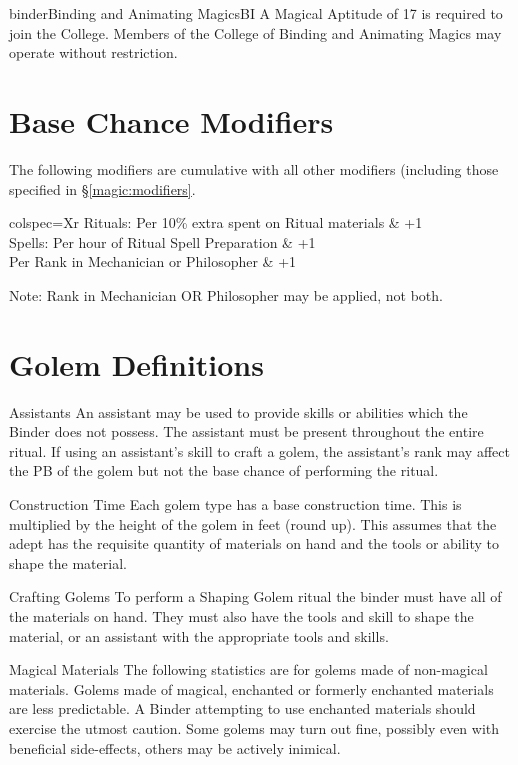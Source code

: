 \begin{College}[1.2]{binder}{Binding and Animating Magics}{BI}
A Magical Aptitude of 17 is required to join the College.  Members of
the College of Binding and Animating Magics may operate without
restriction.

\section{Base Chance Modifiers}

The following modifiers are cumulative with all other modifiers
(including those specified in \S\ref{magic:modifiers}.

\begin{dqtblr}{colspec={Xr}}
Rituals: Per 10\% extra spent on Ritual materials	& +1 \\
Spells: Per hour of Ritual Spell Preparation		& +1 \\
Per Rank in Mechanician or Philosopher			& +1 \\
\end{dqtblr}

Note: Rank in Mechanician OR Philosopher may be applied, not both.


\section{Golem Definitions}

\begin{Description}
\item[Assistants] An assistant may be used to provide skills or
  abilities which the Binder does not possess.  The assistant must be
  present throughout the entire ritual.  If using an assistant’s skill
  to craft a golem, the assistant’s rank may affect the PB of the
  golem but not the base chance of performing the ritual.

\item[Construction Time] Each golem type has a base construction time.
  This is multiplied by the height of the golem in feet (round
  up). This assumes that the adept has the requisite quantity of
  materials on hand and the tools or ability to shape the material.

\item[Crafting Golems] To perform a Shaping Golem ritual the binder
  must have all of the materials on hand.  They must also have the
  tools and skill to shape the material, or an assistant with the
  appropriate tools and skills.

\item[Magical Materials] The following statistics are for golems made
  of non-magical materials.  Golems made of magical, enchanted or
  formerly enchanted materials are less predictable. A Binder
  attempting to use enchanted materials should exercise the utmost
  caution.  Some golems may turn out fine, possibly even with
  beneficial side-effects, others may be actively inimical.


\end{Description}
\end{College}
